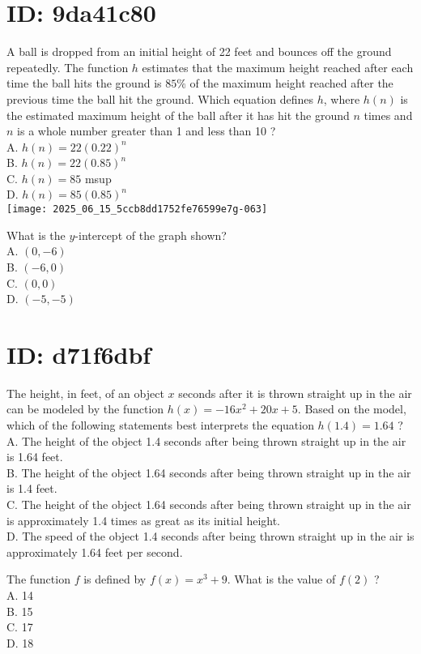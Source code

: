 \section*{ID: 9da41c80}
A ball is dropped from an initial height of 22 feet and bounces off the ground repeatedly. The function $h$ estimates that the maximum height reached after each time the ball hits the ground is $85 \%$ of the maximum height reached after the previous time the ball hit the ground. Which equation defines $h$, where $h(n)$ is the estimated maximum height of the ball after it has hit the ground $n$ times and $n$ is a whole number greater than 1 and less than 10 ?\\
A. $h(n)=22(0.22)^{n}$\\
B. $h(n)=22(0.85)^{n}$\\
C. $h(n)=85$ msup\\
D. $h(n)=85(0.85)^{n}$\\
\texttt{[image: 2025\_06\_15\_5ccb8dd1752fe76599e7g-063]}

What is the $y$-intercept of the graph shown?\\
A. $(0,-6)$\\
B. $(-6,0)$\\
C. $(0,0)$\\
D. $(-5,-5)$

\section*{ID: d71f6dbf}
The height, in feet, of an object $x$ seconds after it is thrown straight up in the air can be modeled by the function $h(x)=-16 x^{2}+20 x+5$. Based on the model, which of the following statements best interprets the equation $h(1.4)=1.64$ ?\\
A. The height of the object 1.4 seconds after being thrown straight up in the air is 1.64 feet.\\
B. The height of the object 1.64 seconds after being thrown straight up in the air is 1.4 feet.\\
C. The height of the object 1.64 seconds after being thrown straight up in the air is approximately 1.4 times as great as its initial height.\\
D. The speed of the object 1.4 seconds after being thrown straight up in the air is approximately 1.64 feet per second.

The function $f$ is defined by $f(x)=x^{3}+9$. What is the value of $f(2)$ ?\\
A. 14\\
B. 15\\
C. 17\\
D. 18

